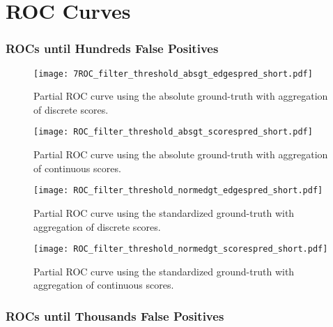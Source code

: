\newpage
\section{ROC Curves}
\label{appendix:roc}

\subsubsection{ROCs until Hundreds False Positives}

\begin{figure}[h!]
    \centering
    \texttt{[image: 7ROC\_filter\_threshold\_absgt\_edgespred\_short.pdf]}
    \caption{Partial ROC curve using the absolute ground-truth with aggregation of discrete scores.}
\end{figure}
\begin{figure}[h!]
    \centering
    \texttt{[image: ROC\_filter\_threshold\_absgt\_scorespred\_short.pdf]}
    \caption{Partial ROC curve using the absolute ground-truth with aggregation of continuous scores.}
\end{figure}
\begin{figure}[h!]
    \centering
    \texttt{[image: ROC\_filter\_threshold\_normedgt\_edgespred\_short.pdf]}
    \caption{Partial ROC curve using the standardized ground-truth with aggregation of discrete scores.}
    \label{fig:app:rocversteeg}
\end{figure}
\begin{figure}[h!]
    \centering
    \texttt{[image: ROC\_filter\_threshold\_normedgt\_scorespred\_short.pdf]}
    \caption{Partial ROC curve using the standardized ground-truth with aggregation of continuous scores.}
\end{figure}




\newpage\phantom{blabla}
\newpage\phantom{blabla}
\subsubsection{ROCs until Thousands False Positives}

